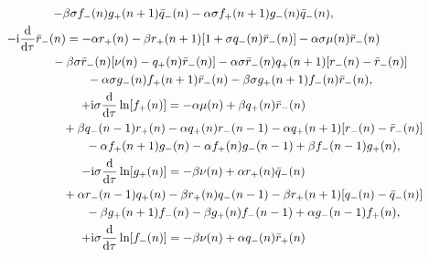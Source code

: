 \documentclass[10pt,a4paper]{amsart}
\numberwithin{equation}{section}
\begin{document}
\begin{gather}
	 -\beta\sigma f_{-}(n)g_{+}(n+1)\bar{q}_{-}(n) -\alpha\sigma f_{+}(n+1)g_{-}(n)\bar{q}_{-}(n), \label{eq-6.7}
\\
	 -\mathrm{i}\frac{\mathrm{d}}{\mathrm{d}\tau}\bar{r}_{-}(n) = -\alpha r_{+}(n) - \beta r_{+}(n+1)[1+\sigma q_{-}(n)\bar{r}_{-}(n)] - \alpha\sigma\mu(n)\bar{r}_{-}(n)\nonumber\\
 \hspace{0.25mm}\hphantom{-\mathrm{i}\frac{\mathrm{d}}{\mathrm{d}\tau}\bar{r}_{-}(n) =}{}
	 -\beta\sigma \bar{r}_{-}(n)[\nu(n)-q_{+}(n)\bar{r}_{-}(n)] - \alpha\sigma \bar{r}_{-}(n)q_{+}(n+1)[r_{-}(n)-\bar{r}_{-}(n)]\nonumber\\
 \hspace{0.25mm}\hphantom{-\mathrm{i}\frac{\mathrm{d}}{\mathrm{d}\tau}\bar{r}_{-}(n) =}{}
	 -\alpha\sigma g_{-}(n)f_{+}(n+1)\bar{r}_{-}(n) -\beta\sigma g_{+}(n+1)f_{-}(n)\bar{r}_{-}(n), \label{eq-6.8}
\\
	 +\mathrm{i}\sigma\frac{\mathrm{d}}{\mathrm{d}\tau}\ln[f_{+}(n)] = -\alpha \mu(n) + \beta q_{+}(n)\bar{r}_{-}(n)\nonumber\\
 \hspace{0.25mm}\hphantom{+\mathrm{i}\sigma\frac{\mathrm{d}}{\mathrm{d}\tau}\ln[f_{+}(n)] =}{}
	 + \beta q_{-}(n-1)r_{+}(n) - \alpha q_{+}(n)r_{-}(n-1) - \alpha q_{+}(n+1)[r_{-}(n)-\bar{r}_{-}(n)]\nonumber\\
 \hspace{0.25mm}\hphantom{+\mathrm{i}\sigma\frac{\mathrm{d}}{\mathrm{d}\tau}\ln[f_{+}(n)] =}{}
	 - \alpha f_{+}(n+1)g_{-}(n) - \alpha f_{+}(n)g_{-}(n-1) + \beta f_{-}(n-1)g_{+}(n), \label{eq-6.9}
\\
	 -\mathrm{i}\sigma\frac{\mathrm{d}}{\mathrm{d}\tau}\ln[g_{+}(n)] = -\beta \nu(n) + \alpha r_{+}(n)\bar{q}_{-}(n)\nonumber\\
 \hspace{0.25mm}\hphantom{-\mathrm{i}\sigma\frac{\mathrm{d}}{\mathrm{d}\tau}\ln[g_{+}(n)] =}{}
	 + \alpha r_{-}(n-1)q_{+}(n) - \beta r_{+}(n)q_{-}(n-1) - \beta r_{+}(n+1)[q_{-}(n)-\bar{q}_{-}(n)]\nonumber\\
 \hspace{0.25mm}\hphantom{-\mathrm{i}\sigma\frac{\mathrm{d}}{\mathrm{d}\tau}\ln[g_{+}(n)] =}{}
	 - \beta g_{+}(n+1)f_{-}(n) - \beta g_{+}(n)f_{-}(n-1) + \alpha g_{-}(n-1)f_{+}(n), \label{eq-6.10}
\\
	 +\mathrm{i}\sigma\frac{\mathrm{d}}{\mathrm{d}\tau}\ln[f_{-}(n)] = -\beta \nu(n) + \alpha q_{-}(n)\bar{r}_{+}(n)\nonumber\\
 \hspace{0.25mm}\hphantom{+\mathrm{i}\sigma\frac{\mathrm{d}}{\mathrm{d}\tau}\ln[f_{-}(n)] =}{}

\end{gather}
\end{document}
